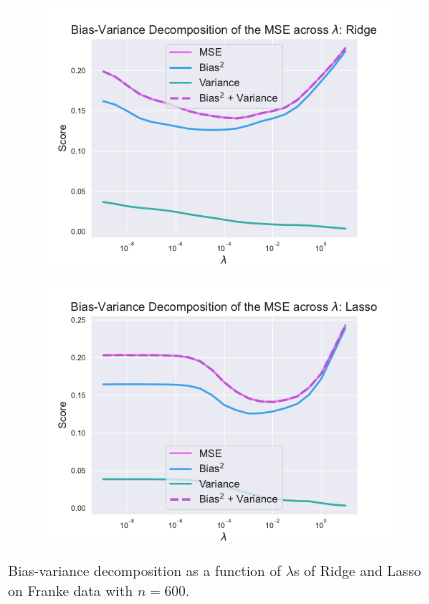 \documentclass[twocolumn,english,notitlepage]{article}
\begin{document}
            \begin{figure}[ht]
                \begin{subfigure}{\linewidth}
                    \centering
                    \includegraphics[width=.9\linewidth]{BS_bias_var_lmbdas_Ridge.pdf}
                \end{subfigure}
                \begin{subfigure}{\linewidth}
                    \centering
                    \includegraphics[width=.9\linewidth]{BS_bias_var_lmbdas_Lasso.pdf}
                \end{subfigure}
                \caption{Bias-variance decomposition as a function of $\lambda$s of Ridge and Lasso on Franke data with $n=600$.}
                \label{res:fig:bs_bias_var_lmbdas_Ridge_Lasso}
            \end{figure}
\end{document}
